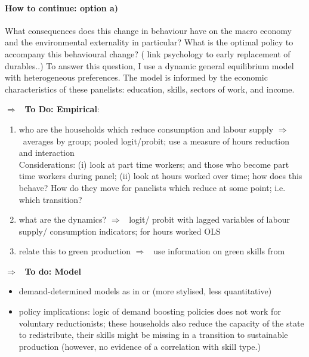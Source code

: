 \documentclass[12pt]{article}
\newcommand{\ar}{$\Rightarrow$ \ }
\newcommand{\tr}[1]{\textcolor{red}{#1}}
\begin{document}
\paragraph{How to continue: option a)}
What consequences does this change in behaviour have on the macro economy and the environmental externality in particular? What is the optimal policy to accompany this behavioural change? (\cite{Hou2020FeelingsIntentions} link psychology to early replacement of durables..)
To answer this question, I use a dynamic general equilibrium model with heterogeneous preferences. The model is informed by the economic characteristics of these panelists: education, skills, sectors of work, and income. 

\ar \textbf{To Do: Empirical}:
\begin{enumerate}
\item who are the households which reduce consumption and labour supply \ar averages by group; pooled logit/probit; use a measure of hours reduction and interaction\\ 
Considerations:
(i) look at part time workers; and those who become part time workers during panel; (ii) look at hours worked over time; how does this behave? How do they move for panelists which reduce at some point; i.e. which transition? 
\item what are the dynamics? \ar logit/ probit with lagged variables of labour supply/ consumption indicators; for hours worked OLS
\item  relate this to green production \ar use information on green skills from \cite{Consoli2016DoCapital} \checkmark
\end{enumerate}

\ar \textbf{To do: Model}
\begin{itemize}
\item demand-determined models as in \cite{Michaillat2015AggregateUnemployment} or (more stylised, less quantitative) \cite{Auerbach2021InequalityEconomy}
\item policy implications: logic of demand boosting policies does not work for voluntary reductionists; these households also reduce the capacity of the state to redistribute, their skills might be missing in a transition to sustainable production (however, no evidence of a correlation with skill type.)
\end{itemize}
\end{document}
